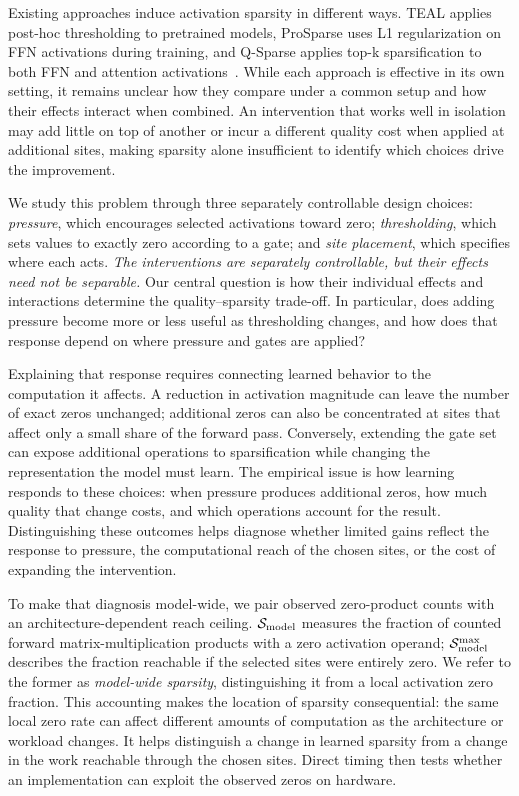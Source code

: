 Existing approaches induce activation sparsity in different ways. TEAL applies post-hoc thresholding to pretrained models, ProSparse uses L1 regularization on FFN activations during training, and Q-Sparse applies top-k sparsification to both FFN and attention activations~\citep{liu2024teal,song2024prosparse,wang2024qsparse}. While each approach is effective in its own setting, it remains unclear how they compare under a common setup and how their effects interact when combined. An intervention that works well in isolation may add little on top of another or incur a different quality cost when applied at additional sites, making sparsity alone insufficient to identify which choices drive the improvement.


We study this problem through three separately controllable design choices:
\emph{pressure}, which encourages selected activations toward zero;
\emph{thresholding}, which sets values to exactly zero according to a gate;
and \emph{site placement}, which specifies where each acts.
\emph{The interventions are separately controllable, but their effects need
not be separable.} Our central question is how their individual effects and
interactions determine the quality--sparsity trade-off. In particular, does
adding pressure become more or less useful as thresholding changes, and how
does that response depend on where pressure and gates are applied?

Explaining that response requires connecting learned behavior to the
computation it affects. A reduction in activation magnitude can leave the
number of exact zeros unchanged; additional zeros can also be concentrated
at sites that affect only a small share of the forward pass. Conversely,
extending the gate set can expose additional operations to sparsification while
changing the representation the model must learn. The empirical issue is how
learning responds to these choices: when pressure produces additional zeros,
how much quality that change costs, and which operations account for the
result. Distinguishing these outcomes helps diagnose whether limited gains
reflect the response to pressure, the computational reach of the chosen sites,
or the cost of expanding the intervention.

To make that diagnosis model-wide, we pair observed zero-product counts with
an architecture-dependent reach ceiling. $\mathcal{S}_{\mathrm{model}}$ measures the
fraction of counted forward matrix-multiplication products with a zero
activation operand; $\mathcal{S}_{\mathrm{model}}^{\max}$ describes the fraction
reachable if the selected sites were entirely zero. We refer to the former as
\emph{model-wide sparsity}, distinguishing it from a local activation zero
fraction. This accounting makes the location of sparsity consequential: the
same local zero rate can affect different amounts of computation as the
architecture or workload changes. It helps distinguish a change in learned
sparsity from a change in the work reachable through the chosen sites.
Direct timing then tests
whether an implementation can exploit the observed zeros on hardware.

